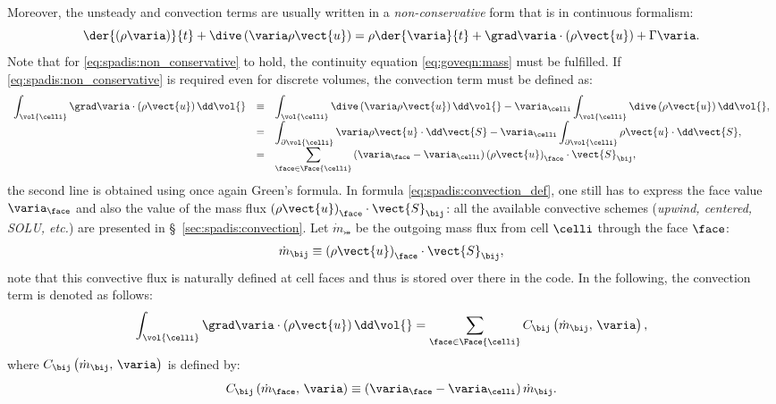 Moreover, the unsteady and convection terms are usually written in a \emph{non-conservative} form that is in continuous formalism:
\begin{equation}\label{eq:spadis:non_conservative}
 \der{ \left( \rho\varia \right)}{t} + \dive \left(  \varia  \rho \vect{u}\right) = \rho \der{\varia }{t} + \grad \varia \cdot \left( \rho \vect{u}\right) + \Gamma \varia.
 \end{equation}
 Note that for \eqref{eq:spadis:non_conservative} to hold, the continuity equation \eqref{eq:goveqn:mass} must be fulfilled.
 If \eqref{eq:spadis:non_conservative} is required even for discrete volumes, the convection term must be defined as:
 \begin{equation}\label{eq:spadis:convection_def}
 \begin{array}{r c l}
\displaystyle \int_{\vol{\celli}} \grad \varia \cdot \left( \rho \vect{u} \right) \dd \vol{} &\equiv &
\displaystyle \int_{\vol{\celli}}  \dive \left( \varia \rho \vect{u} \right) \dd \vol{}  - \varia_\celli  \int_{\vol{\celli}} \dive \left(\rho \vect{u} \right) \dd \vol{}, \\
 &=&
 \displaystyle \int_{ \partial \vol{\celli}}   \varia \rho \vect{u} \cdot \dd \vect{S}  - \varia_\celli  \int_{ \partial \vol{\celli}} \rho \vect{u} \cdot \dd \vect{S}, \\
 &=&
\displaystyle \sum_{\face \in \Face{\celli}} \left(\varia_\face - \varia_\celli \right) \left(\rho \vect{u}\right)_\face \cdot \vect{S}_{\bij},
 \end{array}
 \end{equation}
the second line is obtained using once again Green's formula. In formula \eqref{eq:spadis:convection_def}, one still has to express the face value
 $\varia_\face$ and also the value of the mass flux $\left(\rho \vect{u}\right)_\face\cdot \vect{S}_{\bij}$: all the available convective schemes (\emph{upwind, centered, SOLU, etc.}) are presented in \S~\ref{sec:spadis:convection}. Let $\dot{m}_{\bij}$ be the outgoing
 mass flux from cell $\celli$ through the face $\face$:
  \begin{equation}\label{eq:spadis:massflux_def}
\dot{m}_{\bij} \equiv \left(\rho \vect{u}\right)_\face \cdot \vect{S}_{\bij},
 \end{equation}
note that this convective flux is naturally defined at cell faces and thus is stored over there in the code. In the following, the convection term is denoted as follows:
\begin{equation}\label{eq:spadis:convection_notation}
\displaystyle \int_{\vol{\celli}} \grad \varia \cdot \left( \rho \vect{u} \right) \dd \vol{}
=
\displaystyle \sum_{\face \in \Face{\celli}} C_{\bij} \left( \dot{m}_{\bij} , \, \varia \right),
 \end{equation}
where $C_{\bij} \left(  \dot{m}_{\bij}  , \, \varia\right)$ is defined by:
\begin{equation}\label{eq:spadis:convection_flux}
C_{\bij} \left(\dot{m}_\face , \, \varia \right) \equiv  \left(\varia_\face - \varia_\celli \right) \dot{m}_{\bij}.
 \end{equation}

